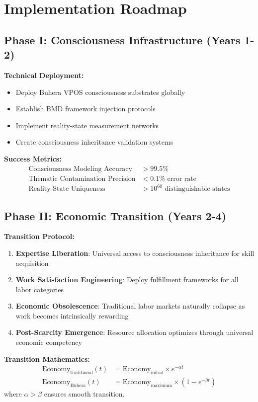 \documentclass[12pt,a4paper]{article}
\begin{document}
\section{Implementation Roadmap}

\subsection{Phase I: Consciousness Infrastructure (Years 1-2)}

\textbf{Technical Deployment:}
\begin{itemize}
\item Deploy Buhera VPOS consciousness substrates globally
\item Establish BMD framework injection protocols
\item Implement reality-state measurement networks
\item Create consciousness inheritance validation systems
\end{itemize}

\textbf{Success Metrics:}
\begin{align}
\text{Consciousness Modeling Accuracy} &> 99.5\%\\
\text{Thematic Contamination Precision} &< 0.1\% \text{ error rate}\\
\text{Reality-State Uniqueness} &> 10^{60} \text{ distinguishable states}
\end{align}

\subsection{Phase II: Economic Transition (Years 2-4)}

\textbf{Transition Protocol:}
\begin{enumerate}
\item \textbf{Expertise Liberation}: Universal access to consciousness inheritance for skill acquisition
\item \textbf{Work Satisfaction Engineering}: Deploy fulfillment frameworks for all labor categories
\item \textbf{Economic Obsolescence}: Traditional labor markets naturally collapse as work becomes intrinsically rewarding
\item \textbf{Post-Scarcity Emergence}: Resource allocation optimizes through universal economic competency
\end{enumerate}

\textbf{Transition Mathematics:}
\begin{align}
\text{Economy}_{\text{traditional}}(t) &= \text{Economy}_{\text{initial}} \times e^{-\alpha t}\\
\text{Economy}_{\text{Buhera}}(t) &= \text{Economy}_{\text{maximum}} \times (1 - e^{-\beta t})
\end{align}
where $\alpha > \beta$ ensures smooth transition.
\end{document}

